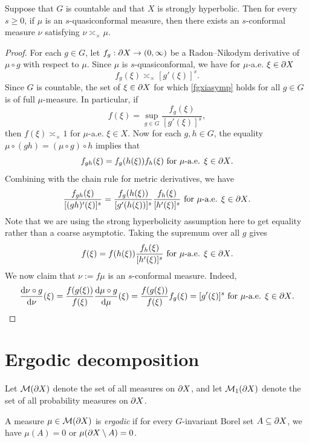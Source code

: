 \begin{proposition}
\label{propositionQCtoC}
Suppose that $G$ is countable and that $X$ is strongly hyperbolic. Then for every $s\geq 0$, if $\mu$ is an $s$-quasiconformal measure, then there exists an $s$-conformal measure $\nu$ satisfying $\nu\asymp_\times \mu$.
\end{proposition}
\begin{proof}
For each $g\in G$, let $f_g:\partial X\to(0,\infty)$ be a Radon--Nikodym derivative of $\mu\circ g$ with respect to $\mu$. Since $\mu$ is $s$-quasiconformal, we have for $\mu$-a.e. $\xi\in\partial X$
\begin{equation}
\label{fgxiasymp}
f_g(\xi) \asymp_\times [g'(\xi)]^s.
\end{equation}
Since $G$ is countable, the set of $\xi\in\partial X$ for which \eqref{fgxiasymp} holds for all $g\in G$ is of full $\mu$-measure. In particular, if
\[
f(\xi) = \sup_{g\in G} \frac{f_g(\xi)}{[g'(\xi)]^s},
\]
then $f(\xi)\asymp_\times 1$ for $\mu$-a.e. $\xi\in X$. Now for each $g,h\in G$, the equality $\mu\circ(gh) = (\mu\circ g)\circ h$ implies that
\[
f_{gh}(\xi) = f_g(h(\xi)) f_h(\xi) \textup{ for $\mu$-a.e. $\xi\in\partial X$.}
\]
Combining with the chain rule for metric derivatives, we have
\[
\frac{f_{gh}(\xi)}{[(gh)'(\xi)]^s} = \frac{f_g(h(\xi))}{[g'(h(\xi))]^s}\frac{f_h(\xi)}{[h'(\xi)]^s} \textup{ for $\mu$-a.e. $\xi\in\partial X$.}
\]
Note that we are using the strong hyperbolicity assumption here to get equality rather than a coarse asymptotic. Taking the supremum over all $g$ gives
\[
f(\xi) = f(h(\xi))\frac{f_h(\xi)}{[h'(\xi)]^s} \textup{ for $\mu$-a.e. $\xi\in\partial X$.}
\]
We now claim that $\nu := f\mu$ is an $s$-conformal measure. Indeed,
\[
\frac{\mathrm{d}\nu\circ g}{\mathrm{d}\nu}(\xi)
= \frac{f(g(\xi))}{f(\xi)}\frac{\mathrm{d}\mu\circ g}{\mathrm{d}\mu}(\xi)
= \frac{f(g(\xi))}{f(\xi)}f_g(\xi)
= [g'(\xi)]^s \textup{ for $\mu$-a.e. $\xi\in\partial X$.}
\]
\end{proof}

\section{Ergodic decomposition}

Let $\mathcal M(\partial X)$ denote the set of all measures on $\partial X$, and let $\mathcal M_1(\partial X)$ denote the set of all probability measures on $\partial X$.

\begin{definition}
\label{definitionergodic}
A measure $\mu\in\mathcal M(\partial X)$ is \emph{ergodic} if for every $G$-invariant Borel set $A\subseteq\partial X$, we have $\mu(A) = 0$ or $\mu(\partial X\setminus A) = 0$.
\end{definition}

